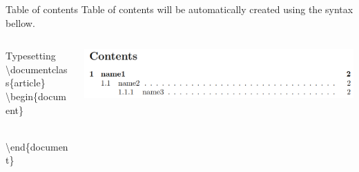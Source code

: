 \documentclass[10pt,xcolor={dvipsnames}]{beamer}
\begin{document}
		\begin{frame}{Table of contents}
			\onslide<2->
			Table of contents will be automatically created using the syntax bellow.\\
			
			\begin{columns}[T]
				\begin{column}{.4 \textwidth}
					
					\begin{block}{Typesetting}
						\textbackslash documentclass\{{\color{blue}article}\}\\
						
						\textbackslash begin\{{\color{blue}document}\}\\
						
						\\
						
						\textbackslash end\{{\color{blue}document}\}
						
					\end{block}	
				\end{column}
				
				\begin{column}{.6 \textwidth}
					\vspace{1cm}
					\includegraphics[width=1\textwidth]{Images/tableofcontents.png}
				\end{column}
			\end{columns}
		
		\end{frame}
	
\end{document}
